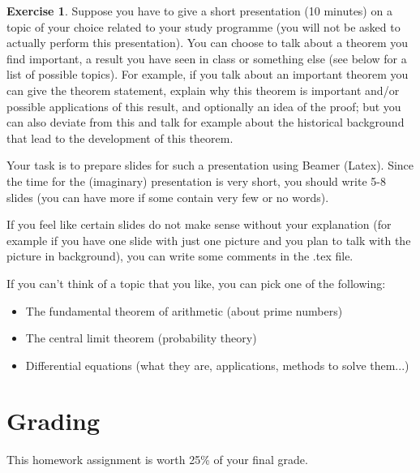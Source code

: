 \documentclass[12pt,a4paper]{article}
\theoremstyle{definition}
\newtheorem{ex}{Exercise}
\theoremstyle{definition}
\begin{document}
\vspace{0.8cm}

\begin{ex}
  Suppose you have to give a short presentation (10 minutes) on a topic of
  your choice related to your study programme (you will not be asked to
  actually perform this presentation). You can choose to talk about a theorem
  you find important, a result you have seen in class or something else (see
  below for a list of possible topics). For example, if you talk about an
  important theorem you can give the theorem statement, explain why this
  theorem is important and/or possible applications of this result, and
  optionally an idea of the proof; but you can also deviate from this and talk
  for example about the historical background that lead to the development of
  this theorem.

  Your task is to prepare slides for such a presentation using Beamer (Latex).
  Since the time for the (imaginary) presentation is very short, you should
  write 5-8 slides (you can have more if some contain very few or no
  words).

  If you feel like certain slides do not make sense without your explanation
  (for example if you have one slide with just one picture and you plan to
  talk with the picture in background), you can write some comments in the
  .tex file.

  If you can't think of a topic that you like, you can pick one of the
  following:
  \begin{itemize}
    \item The fundamental theorem of arithmetic (about prime numbers)
    \item The central limit theorem (probability theory)
    \item Differential equations (what they are, applications,
          methods to solve them...)
  \end{itemize}
\end{ex}

\newpage
\section*{Grading}

This homework assignment is worth 25\% of your final grade.
\end{document}
